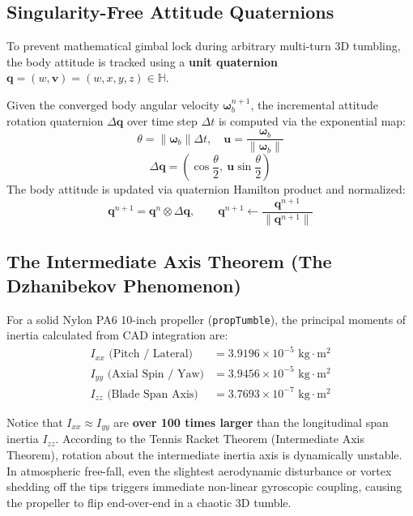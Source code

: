 \documentclass[11pt,a4paper]{article}
\newcommand{\vect}[1]{\mathbf{#1}}
\newcommand{\omegab}{\bm{\omega}_b}
\begin{document}
\subsection{Singularity-Free Attitude Quaternions}
To prevent mathematical gimbal lock during arbitrary multi-turn 3D tumbling, the body attitude is tracked using a \textbf{unit quaternion} $\vect{q} = (w, \vect{v}) = (w, x, y, z) \in \mathbb{H}$.

Given the converged body angular velocity $\omegab^{n+1}$, the incremental attitude rotation quaternion $\Delta \vect{q}$ over time step $\Delta t$ is computed via the exponential map:
\begin{equation}
    \theta = \|\omegab\|\Delta t, \quad \vect{u} = \frac{\omegab}{\|\omegab\|}
\end{equation}
\begin{equation}
    \Delta \vect{q} = \left( \cos\frac{\theta}{2}, \ \vect{u} \sin\frac{\theta}{2} \right)
\end{equation}
The body attitude is updated via quaternion Hamilton product and normalized:
\begin{equation}
    \vect{q}^{n+1} = \vect{q}^n \otimes \Delta \vect{q}, \qquad \vect{q}^{n+1} \leftarrow \frac{\vect{q}^{n+1}}{\|\vect{q}^{n+1}\|}
\end{equation}

\subsection{The Intermediate Axis Theorem (The Dzhanibekov Phenomenon)}
For a solid Nylon PA6 10-inch propeller (\texttt{propTumble}), the principal moments of inertia calculated from CAD integration are:
\begin{equation}
    \begin{aligned}
        I_{xx} \text{ (Pitch / Lateral)}   &= 3.9196 \times 10^{-5}\text{ kg}\cdot\text{m}^2 \\
        I_{yy} \text{ (Axial Spin / Yaw)}  &= 3.9456 \times 10^{-5}\text{ kg}\cdot\text{m}^2 \\
        I_{zz} \text{ (Blade Span Axis)}   &= 3.7693 \times 10^{-7}\text{ kg}\cdot\text{m}^2
    \end{aligned}
\end{equation}

\begin{warningbox}
Notice that $I_{xx} \approx I_{yy}$ are \textbf{over 100 times larger} than the longitudinal span inertia $I_{zz}$. 
According to the Tennis Racket Theorem (Intermediate Axis Theorem), rotation about the intermediate inertia axis is dynamically unstable. 
In atmospheric free-fall, even the slightest aerodynamic disturbance or vortex shedding off the tips triggers immediate non-linear gyroscopic coupling, causing the propeller to flip end-over-end in a chaotic 3D tumble.
\end{warningbox}
\end{document}
